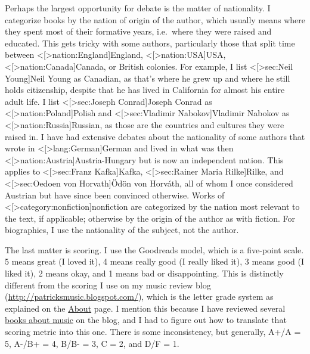 \documentclass[12pt]{article}
\def\hyperref#1{<#1>} %
\begin{document}
Perhaps the largest opportunity for debate is the matter of nationality. I categorize books by the nation of origin of the author, which usually means where they spent most of their formative years, i.e.\ where they were raised and educated. This gets tricky with some authors, particularly those that split time between \hyperref[nation:England]{England}, \hyperref[nation:USA]{USA}, \hyperref[nation:Canada]{Canada}, or British colonies. For example, I list \hyperref[sec:Neil Young]{Neil Young} as Canadian, as that's where he grew up and where he still holds citizenship, despite that he has lived in California for almost his entire adult life. I list \hyperref[sec:Joseph Conrad]{Joseph Conrad} as \hyperref[nation:Poland]{Polish} and \hyperref[sec:Vladimir Nabokov]{Vladimir Nabokov} as \hyperref[nation:Russia]{Russian}, as those are the countries and cultures they were raised in. I have had extensive debates about the nationality of some authors that wrote in \hyperref[lang:German]{German} and lived in what was then \hyperref[nation:Austria]{Austria-Hungary} but is now an independent nation. This applies to \hyperref[sec:Franz Kafka]{Kafka}, \hyperref[sec:Rainer Maria Rilke]{Rilke}, and \hyperref[sec:Oedoen von Horvath]{Ödön von Horváth}, all of whom I once considered Austrian but have since been convinced otherwise. Works of \hyperref[category:nonfiction]{nonfiction} are categorized by the nation most relevant to the text, if applicable; otherwise by the origin of the author as with fiction. For biographies, I use the nationality of the subject, not the author.

The last matter is scoring. I use the Goodreads model, which is a five-point scale. 5 means great (I loved it), 4 means really good (I really liked it), 3 means good (I liked it), 2 means okay, and 1 means bad or disappointing. This is distinctly different from the scoring I use on my music review blog (\url{http://patricksmusic.blogspot.com/}), which is the letter grade system as explained on the \href{http://patricksmusic.blogspot.com/p/about.html}{About} page. I mention this because I have reviewed several \href{http://patricksmusic.blogspot.com/search/label/book%20review}{books about music} on the blog, and I had to figure out how to translate that scoring metric into this one. There is some inconsistency, but generally, A+/A = 5, A-/B+ = 4, B/B- = 3, C = 2, and D/F = 1.


\tableofcontents \label{sec:toc}
\end{document}
